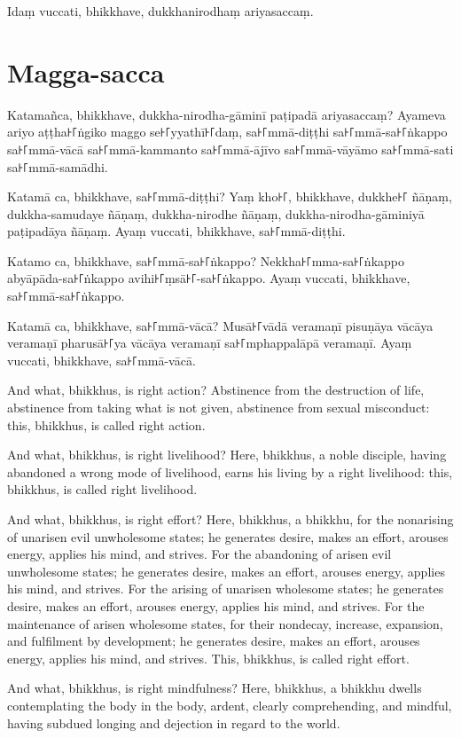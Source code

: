 Idaṃ vuccati, bhikkhave, dukkhanirodhaṃ ariyasaccaṃ.

\section*{Magga-sacca}

Katamañca, bhikkhave, dukkha-nirodha-gāminī paṭipadā ariyasaccaṃ? Ayameva ariyo
aṭṭha꜔꜒ṅgiko maggo se꜔꜒yyathī꜔꜒daṃ, sa꜔꜒mmā-diṭṭhi sa꜔꜒mmā-sa꜔꜒ṅkappo sa꜔꜒mmā-vācā
sa꜔꜒mmā-kammanto sa꜔꜒mmā-ājīvo sa꜔꜒mmā-vāyāmo sa꜔꜒mmā-sati sa꜔꜒mmā-samādhi.

Katamā ca, bhikkhave, sa꜔꜒mmā-diṭṭhi? Yaṃ kho꜔꜒, bhikkhave, dukkhe꜔꜒ ñāṇaṃ,
dukkha-samudaye ñāṇaṃ, dukkha-nirodhe ñāṇaṃ, dukkha-nirodha-gāminiyā paṭipadāya
ñāṇaṃ. Ayaṃ vuccati, bhikkhave, sa꜔꜒mmā-diṭṭhi.

Katamo ca, bhikkhave, sa꜔꜒mmā-sa꜔꜒ṅkappo? Nekkha꜔꜒mma-sa꜔꜒ṅkappo abyāpāda-sa꜔꜒ṅkappo
avihi꜔꜒ṃsā꜔꜒-sa꜔꜒ṅkappo. Ayaṃ vuccati, bhikkhave, sa꜔꜒mmā-sa꜔꜒ṅkappo.

Katamā ca, bhikkhave, sa꜔꜒mmā-vācā? Musā꜔꜒vādā veramaṇī pisuṇāya vācāya veramaṇī
pharusā꜔꜒ya vācāya veramaṇī sa꜔꜒mphappalāpā veramaṇī. Ayaṃ vuccati, bhikkhave,
sa꜔꜒mmā-vācā.

\englishPage

And what, bhikkhus, is right action? Abstinence from the destruction of life,
abstinence from taking what is not given, abstinence from sexual misconduct:
this, bhikkhus, is called right action.

And what, bhikkhus, is right livelihood? Here, bhikkhus, a noble disciple,
having abandoned a wrong mode of livelihood, earns his living by a right
livelihood: this, bhikkhus, is called right livelihood.

And what, bhikkhus, is right effort? Here, bhikkhus, a bhikkhu, for the
nonarising of unarisen evil unwholesome states; he generates desire, makes an
effort, arouses energy, applies his mind, and strives. For the abandoning of
arisen evil unwholesome states; he generates desire, makes an effort, arouses
energy, applies his mind, and strives. For the arising of unarisen wholesome
states; he generates desire, makes an effort, arouses energy, applies his mind,
and strives. For the maintenance of arisen wholesome states, for their nondecay,
increase, expansion, and fulfilment by development; he generates desire, makes
an effort, arouses energy, applies his mind, and strives. This, bhikkhus, is
called right effort.

And what, bhikkhus, is right mindfulness? Here, bhikkhus, a bhikkhu dwells
contemplating the body in the body, ardent, clearly comprehending, and mindful,
having subdued longing and dejection in regard to the world.

